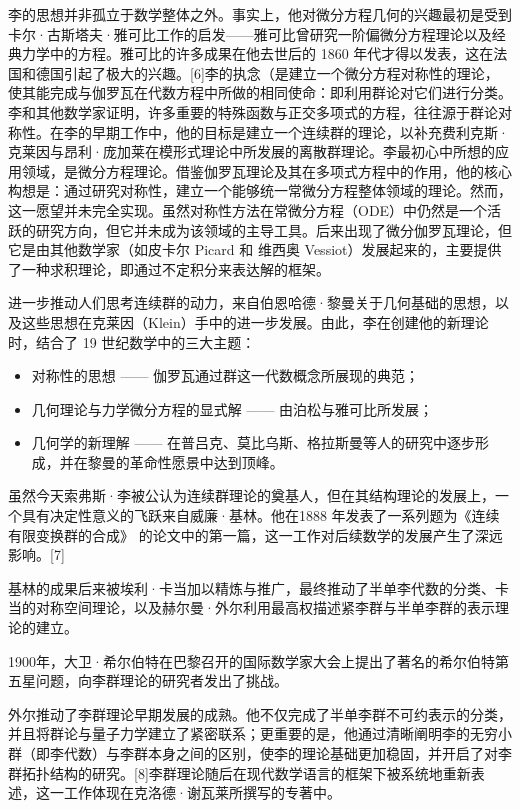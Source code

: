 李的思想并非孤立于数学整体之外。事实上，他对微分方程几何的兴趣最初是受到卡尔·古斯塔夫·雅可比工作的启发——雅可比曾研究一阶偏微分方程理论以及经典力学中的方程。雅可比的许多成果在他去世后的 1860 年代才得以发表，这在法国和德国引起了极大的兴趣。[6]李的执念（是建立一个微分方程对称性的理论，使其能完成与伽罗瓦在代数方程中所做的相同使命：即利用群论对它们进行分类。李和其他数学家证明，许多重要的特殊函数与正交多项式的方程，往往源于群论对称性。在李的早期工作中，他的目标是建立一个连续群的理论，以补充费利克斯·克莱因与昂利·庞加莱在模形式理论中所发展的离散群理论。李最初心中所想的应用领域，是微分方程理论。借鉴伽罗瓦理论及其在多项式方程中的作用，他的核心构想是：通过研究对称性，建立一个能够统一常微分方程整体领域的理论。然而，这一愿望并未完全实现。虽然对称性方法在常微分方程（ODE）中仍然是一个活跃的研究方向，但它并未成为该领域的主导工具。后来出现了微分伽罗瓦理论，但它是由其他数学家（如皮卡尔 Picard 和 维西奥 Vessiot）发展起来的，主要提供了一种求积理论，即通过不定积分来表达解的框架。

进一步推动人们思考连续群的动力，来自伯恩哈德·黎曼关于几何基础的思想，以及这些思想在克莱因（Klein）手中的进一步发展。由此，李在创建他的新理论时，结合了 19 世纪数学中的三大主题：

\begin{itemize}
\item 对称性的思想 —— 伽罗瓦通过群这一代数概念所展现的典范；
\item 几何理论与力学微分方程的显式解 —— 由泊松与雅可比所发展；
\item 几何学的新理解 —— 在普吕克、莫比乌斯、格拉斯曼等人的研究中逐步形成，并在黎曼的革命性愿景中达到顶峰。
\end{itemize}
虽然今天索弗斯·李被公认为连续群理论的奠基人，但在其结构理论的发展上，一个具有决定性意义的飞跃来自威廉·基林。他在1888 年发表了一系列题为《连续有限变换群的合成》 的论文中的第一篇，这一工作对后续数学的发展产生了深远影响。[7]

基林的成果后来被埃利·卡当加以精炼与推广，最终推动了半单李代数的分类、卡当的对称空间理论，以及赫尔曼·外尔利用最高权描述紧李群与半单李群的表示理论的建立。

1900年，大卫·希尔伯特在巴黎召开的国际数学家大会上提出了著名的希尔伯特第五星问题，向李群理论的研究者发出了挑战。

外尔推动了李群理论早期发展的成熟。他不仅完成了半单李群不可约表示的分类，并且将群论与量子力学建立了紧密联系；更重要的是，他通过清晰阐明李的无穷小群（即李代数）与李群本身之间的区别，使李的理论基础更加稳固，并开启了对李群拓扑结构的研究。[8]李群理论随后在现代数学语言的框架下被系统地重新表述，这一工作体现在克洛德·谢瓦莱所撰写的专著中。
